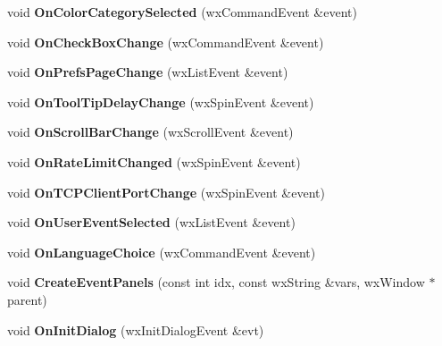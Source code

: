 \begin{DoxyCompactItemize}
\item 
void {\bfseries OnColorCategorySelected} (wxCommandEvent \&event)\label{classPrefsUnifiedDlg_ae062a1287d1f5703802cb8223e083afc}

\item 
void {\bfseries OnCheckBoxChange} (wxCommandEvent \&event)\label{classPrefsUnifiedDlg_ae14cbe765dbf57bc12cc7bc31bd9c4ac}

\item 
void {\bfseries OnPrefsPageChange} (wxListEvent \&event)\label{classPrefsUnifiedDlg_a10d65591e03eb3454eace5dae605be85}

\item 
void {\bfseries OnToolTipDelayChange} (wxSpinEvent \&event)\label{classPrefsUnifiedDlg_a0b5320451074e47bbc0a486bae4d1a57}

\item 
void {\bfseries OnScrollBarChange} (wxScrollEvent \&event)\label{classPrefsUnifiedDlg_a0c7c603926cb89d94e506d7b5ec22bcd}

\item 
void {\bfseries OnRateLimitChanged} (wxSpinEvent \&event)\label{classPrefsUnifiedDlg_a777b5d2f3af035223efe70d651449deb}

\item 
void {\bfseries OnTCPClientPortChange} (wxSpinEvent \&event)\label{classPrefsUnifiedDlg_a35b38981c270f3201902b75cd39f7491}

\item 
void {\bfseries OnUserEventSelected} (wxListEvent \&event)\label{classPrefsUnifiedDlg_af8fd6dc3ba1f2d7a3c0abe9e6e1e5ede}

\item 
void {\bfseries OnLanguageChoice} (wxCommandEvent \&event)\label{classPrefsUnifiedDlg_af7949e2881ad78f1db04346eb809f4be}

\item 
void {\bfseries CreateEventPanels} (const int idx, const wxString \&vars, wxWindow $\ast$parent)\label{classPrefsUnifiedDlg_a31637d54d4d4d4d177265cdbf96a71a1}

\item 
void {\bfseries OnInitDialog} (wxInitDialogEvent \&evt)\label{classPrefsUnifiedDlg_ac90011227a80fc10501b744453b605fd}

\end{DoxyCompactItemize}
